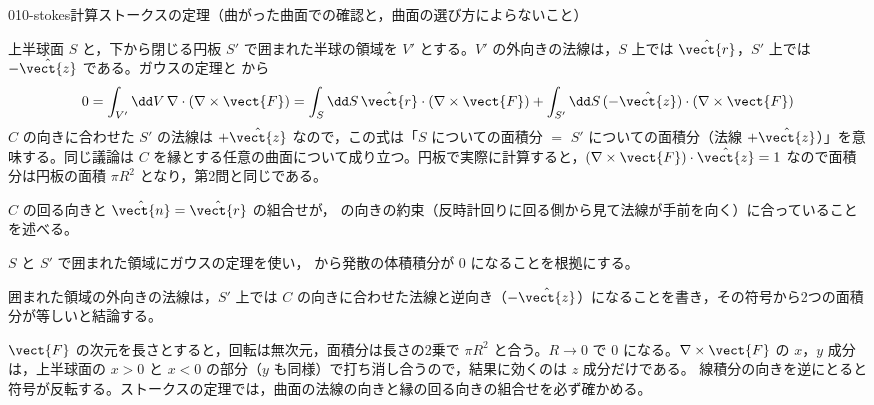 \documentclass[uplatex,dvipdfmx,a4paper,11pt]{jsarticle}
\begin{document}
\begin{mondai}{010-stokes}{計算}{ストークスの定理（曲がった曲面での確認と，曲面の選び方によらないこと）}
\begin{tadashii}
 上半球面 $S$ と，下から閉じる円板 $S'$ で囲まれた半球の領域を $V'$ とする。$V'$ の外向きの法線は，$S$ 上では $\hat{\vect{r}}$，$S'$ 上では $-\hat{\vect{z}}$ である。ガウスの定理と  から
\[ 0 = \int_{V'}\dd V\,\nabla\cdot(\nabla\times\vect{F}) = \int_S\dd S\,\hat{\vect{r}}\cdot(\nabla\times\vect{F}) + \int_{S'}\dd S\,(-\hat{\vect{z}})\cdot(\nabla\times\vect{F}) \]
$C$ の向きに合わせた $S'$ の法線は $+\hat{\vect{z}}$ なので，この式は「$S$ についての面積分 $=$ $S'$ についての面積分（法線 $+\hat{\vect{z}}$）」を意味する。同じ議論は $C$ を縁とする任意の曲面について成り立つ。円板で実際に計算すると，$(\nabla\times\vect{F})\cdot\hat{\vect{z}} = 1$ なので面積分は円板の面積 $\pi R^2$ となり，第2問と同じである。
\begin{ronten}
  \item {} $C$ の回る向きと $\hat{\vect{n}}=\hat{\vect{r}}$ の組合せが， の向きの約束（反時計回りに回る側から見て法線が手前を向く）に合っていることを述べる。
  \item {} $S$ と $S'$ で囲まれた領域にガウスの定理を使い， から発散の体積積分が $0$ になることを根拠にする。
  \item {} 囲まれた領域の外向きの法線は，$S'$ 上では $C$ の向きに合わせた法線と逆向き（$-\hat{\vect{z}}$）になることを書き，その符号から2つの面積分が等しいと結論する。
\end{ronten}
\kenzan $\vect{F}$ の次元を長さとすると，回転は無次元，面積分は長さの2乗で $\pi R^2$ と合う。$R \to 0$ で $0$ になる。$\nabla\times\vect{F}$ の $x$，$y$ 成分は，上半球面の $x > 0$ と $x < 0$ の部分（$y$ も同様）で打ち消し合うので，結果に効くのは $z$ 成分だけである。
\tsumazuki 線積分の向きを逆にとると符号が反転する。ストークスの定理では，曲面の法線の向きと縁の回る向きの組合せを必ず確かめる。
\end{tadashii}
\end{mondai}

\noteowari
\end{document}
